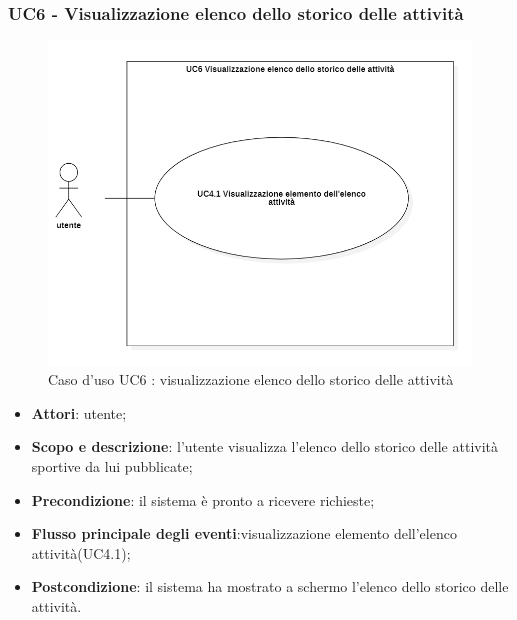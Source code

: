 \subsubsection{UC6 - Visualizzazione elenco dello storico delle attività}
\begin{figure}[H]
	\centering
	\includegraphics[width=0.8\linewidth]{res/images/UC6.png}
	\caption{Caso d'uso UC6 : visualizzazione elenco dello storico delle attività}
\end{figure}
\begin{itemize}
\item \textbf{Attori}: utente;
\item \textbf{Scopo e descrizione}: l’utente visualizza l'elenco dello storico delle attività sportive da lui pubblicate;
\item \textbf{Precondizione}: il sistema è pronto a ricevere richieste;
\item \textbf{Flusso principale degli eventi}:visualizzazione elemento dell'elenco attività(UC4.1);
\item \textbf{Postcondizione}: il sistema ha mostrato a schermo l'elenco dello storico delle attività.
\end{itemize}


